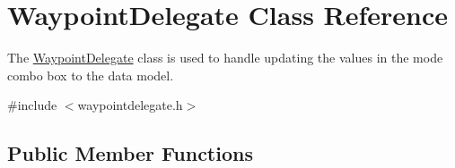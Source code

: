 \hypertarget{class_waypoint_delegate}{\section{\-Waypoint\-Delegate \-Class \-Reference}
\label{class_waypoint_delegate}
}


\-The \hyperlink{class_waypoint_delegate}{\-Waypoint\-Delegate} class is used to handle updating the values in the mode combo box to the data model.  




{\ttfamily \#include $<$waypointdelegate.\-h$>$}

\subsection*{\-Public \-Member \-Functions}
